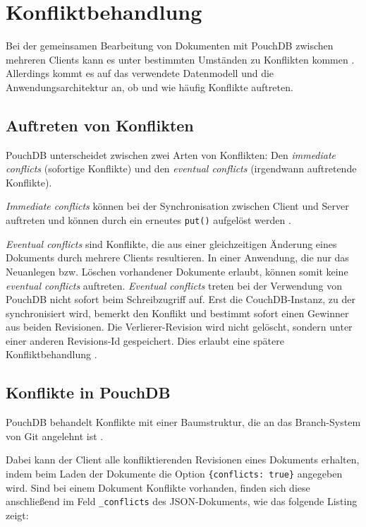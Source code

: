\chapter{Konfliktbehandlung}
\label{Konfliktbehandlung}

Bei der gemeinsamen Bearbeitung von Dokumenten mit PouchDB zwischen mehreren Clients kann es unter bestimmten Umständen zu Konflikten kommen \cite{pouch:conflicts}. Allerdings kommt es auf das verwendete Datenmodell und die Anwendungsarchitektur an, ob und wie häufig Konflikte auftreten.

\section{Auftreten von Konflikten}

PouchDB unterscheidet zwischen zwei Arten von Konflikten: Den \emph{immediate conflicts} (sofortige Konflikte) und den \emph{eventual conflicts} (irgendwann auftretende Konflikte). 

\emph{Immediate conflicts} können bei der Synchronisation zwischen Client und Server auftreten und können durch ein erneutes \texttt{put()} aufgelöst werden \cite{pouch:conflicts}.

\emph{Eventual conflicts} sind Konflikte, die aus einer gleichzeitigen Änderung eines Dokuments durch mehrere Clients resultieren. In einer Anwendung, die nur das Neuanlegen bzw. Löschen vorhandener Dokumente erlaubt, können somit keine \emph{eventual conflicts} auftreten. \emph{Eventual conflicts} treten bei der Verwendung von PouchDB nicht sofort beim Schreibzugriff auf. Erst die CouchDB-Instanz, zu der synchronisiert wird, bemerkt den Konflikt und bestimmt sofort einen Gewinner aus beiden Revisionen. Die Verlierer-Revision wird nicht gelöscht, sondern unter einer anderen Revisions-Id gespeichert. Dies erlaubt eine spätere Konfliktbehandlung \cite{pouch:conflicts}.

\section{Konflikte in PouchDB}

PouchDB behandelt Konflikte mit einer Baumstruktur, die an das Branch-System von Git angelehnt ist \cite{pouch:conflicts}. 

Dabei kann der Client alle konfliktierenden Revisionen eines Dokuments erhalten, indem beim Laden der Dokumente die Option \mbox{\texttt{\{conflicts: true\}}} angegeben wird. Sind bei einem Dokument Konflikte vorhanden, finden sich diese anschließend im Feld \texttt{\_conflicts} des JSON-Dokuments, wie das folgende Listing zeigt:

